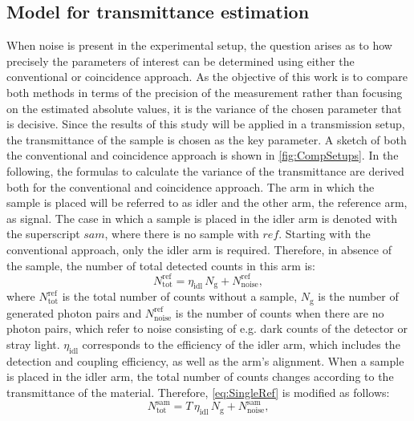 \subsection{Model for transmittance estimation}
When noise is present in the experimental setup, the question arises as to how precisely the parameters of interest can be determined using either the conventional or coincidence approach. As the objective of this work is to compare both methods in terms of the precision of the measurement rather than focusing on the estimated absolute values, it is the variance of the chosen parameter that is decisive. Since the results of this study will be applied in a transmission setup, the transmittance of the sample is chosen as the key parameter. A sketch of both the conventional and coincidence approach is shown in \autoref{fig:CompSetups}.\newline
In the following, the formulas to calculate the variance of the transmittance are derived both for the conventional and coincidence approach. The arm in which the sample is placed will be referred to as idler and the other arm, the reference arm, as signal. The case in which a sample is placed in the idler arm is denoted with the superscript $\textit{sam}$, where there is no sample with $\textit{ref}$. \newline
Starting with the conventional approach, only the idler arm is required. Therefore, in absence of the sample, the number of total detected counts in this arm is: 
\begin{equation}
	N_{\text{tot}}^{\text{ref}} = \eta_{\text{idl}} \, N_{\mathrm{g}} + N_{\text{noise}}^{\text{ref}},
	\label{eq:SingleRef}
\end{equation}
where $N_{\text{tot}}^{\text{ref}}$ is the total number of counts without a sample, $N_{\mathrm{g}}$ is the number of generated photon pairs and $N_{\text{noise}}^{\text{ref}}$ is the number of counts when there are no photon pairs, which refer to noise consisting of e.g. dark counts of the detector or stray light. $\eta_{\text{idl}}$ corresponds to the efficiency of the idler arm, which includes the detection and coupling efficiency, as well as the arm's alignment. \newline
When a sample is placed in the idler arm, the total number of counts changes according to the transmittance of the material. Therefore, \autoref{eq:SingleRef} is modified as follows:
\begin{equation}
	N_{\text{tot}}^{\text{sam}} = T \, \eta_{\text{idl}} \, N_{\mathrm{g}} + N_{\text{noise}}^{\text{sam}},
	\label{eq:SingleSam}
\end{equation}
